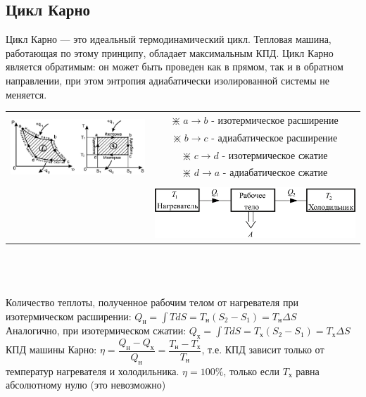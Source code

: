 \begin{multicols*}{2}
		\section{Цикл Карно}
		Цикл Карно — это идеальный термодинамический цикл. Тепловая машина, работающая по этому принципу, обладает максимальным КПД. Цикл Карно является обратимым: он может быть проведен как в прямом, так и в обратном направлении, при этом энтропия адиабатически изолированной системы не меняется.\\
		\begin{tabular}{cc}
			\multirow{5}{*}{\includegraphics[width=0.55\linewidth]{td_imgs/karno_1}} & $\divideontimes$ $a \rightarrow b$ - изотермическое расширение\\
			{} & $\divideontimes$ $b \rightarrow c$ - адиабатическое расширение\\
			{} & $\divideontimes$ $c \rightarrow d$ - изотермическое сжатие\\
			{} & $\divideontimes$ $d \rightarrow a$ - адиабатическое сжатие\\\\
			{} & \includegraphics[width=0.35\linewidth]{td_imgs/karno_2} \\
		\end{tabular}\\\\\\
		Количество теплоты, полученное рабочим телом от нагревателя при изотермическом расширении: $Q_{\text{н}} = \int TdS = T_{\text{н}}(S_2 - S_1) = T_{\text{н}} \Delta S$\\
		Аналогично, при изотермическом сжатии: $Q_{\text{х}} = \int TdS = T_{\text{х}}(S_2 - S_1) = T_{\text{х}} \Delta S$\\
		КПД машины Карно: $\eta = \dfrac{Q_{\text{н}} - Q_{\text{х}}}{Q_{\text{н}}} = \dfrac{T_{\text{н}} - T_{\text{х}}}{T_{\text{н}}}$, т.е. КПД зависит только от температур нагревателя и холодильника. $\eta = 100\%$, только если $T_{\text{х}}$ равна абсолютному нулю (это невозможно)\\
	

\end{multicols*}
